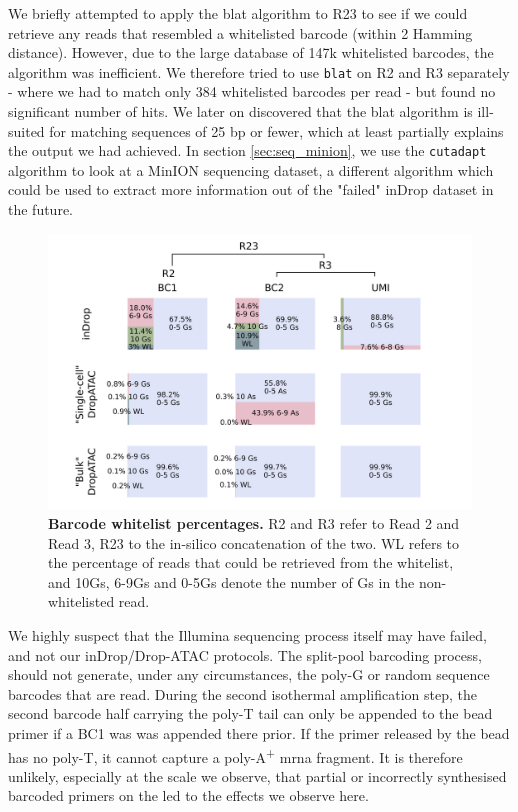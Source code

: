 We briefly attempted to apply the \acrfull{blat} algorithm to R23 to see if we could retrieve any reads that resembled a whitelisted barcode (within 2 Hamming distance). However, due to the large database of 147k whitelisted barcodes, the algorithm was inefficient. We therefore tried to use \verb|blat| on R2 and R3 separately - where we had to match only 384 whitelisted barcodes per read - but found no significant number of hits. We later on discovered that the \acrshort{blat} algorithm is ill-suited for matching sequences of 25 \acrshort{bp} or fewer, which at least partially explains the output we had achieved. In section \ref{sec:seq_minion}, we use the \verb|cutadapt| algorithm to look at a MinION sequencing dataset, a different algorithm which could be used to extract more information out of the "failed" inDrop dataset in the future.\pms

\begin{figure}[ht]
\centerfloat
\includegraphics[width=\textwidth]{./ims/seq_ind_bcdist.png}
\caption[Barcode whitelist percentages]{\textbf{Barcode whitelist percentages.} R2 and R3 refer to Read 2 and Read 3, R23 to the in-silico concatenation of the two. WL refers to the percentage of reads that could be retrieved from the whitelist, and 10Gs, 6-9Gs and 0-5Gs denote the number of Gs in the non-whitelisted read.}
\label{fig:seq_bcdist}
\end{figure}

We highly suspect that the Illumina sequencing process itself may have failed, and not our inDrop/Drop-ATAC protocols. The split-pool barcoding process, should not generate, under any circumstances, the poly-G or random sequence barcodes that are read. During the second isothermal amplification step, the second barcode half carrying the poly-T tail can only be appended to the bead primer if a BC1 was was appended there prior. If the primer released by the bead has no poly-T, it cannot capture a poly-A\textsuperscript{+} \acrshort{mrna} fragment. It is therefore unlikely, especially at the scale we observe, that partial or incorrectly synthesised barcoded primers on the  led to the effects we observe here.\pms

